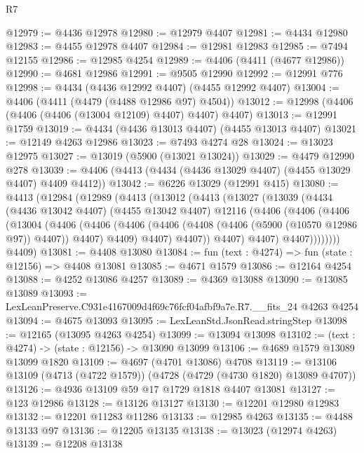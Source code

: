 \begin{lexlean}{R7}
\begin{coremodule}
@12979 := @4436 @12978
@12980 := @12979 @4407
@12981 := @4434 @12980
@12983 := @4455 @12978 @4407
@12984 := @12981 @12983
@12985 := @7494 @12155
@12986 := @12985 @4254
@12989 := @4406 (@4411 (@4677 @12986))
@12990 := @4681 @12986
@12991 := @9505 @12990
@12992 := @12991 @776
@12998 := @4434 (@4436 @12992 @4407) (@4455 @12992 @4407)
@13004 := @4406 (@4411 (@4479 (@4488 @12986 @97) @4504))
@13012 := @12998 (@4406 (@4406 (@4406 (@13004 @12109) @4407) @4407) @4407)
@13013 := @12991 @1759
@13019 := @4434 (@4436 @13013 @4407) (@4455 @13013 @4407)
@13021 := @12149 @4263 @12986
@13023 := @7493 @4274 @28
@13024 := @13023 @12975
@13027 := @13019 (@5900 (@13021 @13024))
@13029 := @4479 @12990 @278
@13039 := @4406 (@4413 (@4434 (@4436 @13029 @4407) (@4455 @13029 @4407) @4409 @4412))
@13042 := @6226 @13029 (@12991 @415)
@13080 := @4413
    (@12984
      (@12989
        (@4413
          (@13012
            (@4413
              (@13027
                (@13039
                  (@4434
                    (@4436 @13042 @4407)
                    (@4455 @13042 @4407)
                    @12116
                    (@4406
                      (@4406
                        (@4406
                          (@13004
                            (@4406
                              (@4406
                                (@4406
                                  (@4406 (@4408 (@4406 (@5900 (@10570 @12986 @97)) @4407)) @4407)
                                  @4409)
                                @4407)
                              @4407))
                          @4407)
                        @4407)
                      @4407))))))))
      @4409)
@13081 := @4408 @13080
@13084 := fun (text : @4274) => fun (state : @12156) => @4408 @13081
@13085 := @4671 @1579
@13086 := @12164 @4254
@13088 := @4252 @13086 @4257
@13089 := @4369 @13088
@13090 := @13085 @13089
@13093 := LexLeanPreserve.C931e4167009d4f69c76fcf04afbf9a7e.R7.__fits_24 @4263 @4254
@13094 := @4675 @13093
@13095 := LexLeanStd.JsonRead.stringStep
@13098 := @12165 (@13095 @4263 @4254)
@13099 := @13094 @13098
@13102 := (text : @4274) -> (state : @12156) -> @13090 @13099
@13106 := @4689 @1579 @13089 @13099 @1820
@13109 := @4697 (@4701 @13086) @4708
@13119 := @13106 @13109 (@4713 (@4722 @1579)) (@4728 (@4729 (@4730 @1820) @13089 @4707))
@13126 := @4936 @13109 @59 @17 @1729 @1818 @4407 @13081
@13127 := @123 @12986
@13128 := @13126 @13127
@13130 := @12201 @12980 @12983
@13132 := @12201 @11283 @11286
@13133 := @12985 @4263
@13135 := @4488 @13133 @97
@13136 := @12205 @13135
@13138 := @13023 (@12974 @4263)
@13139 := @12208 @13138

\end{coremodule}
\end{lexlean}
